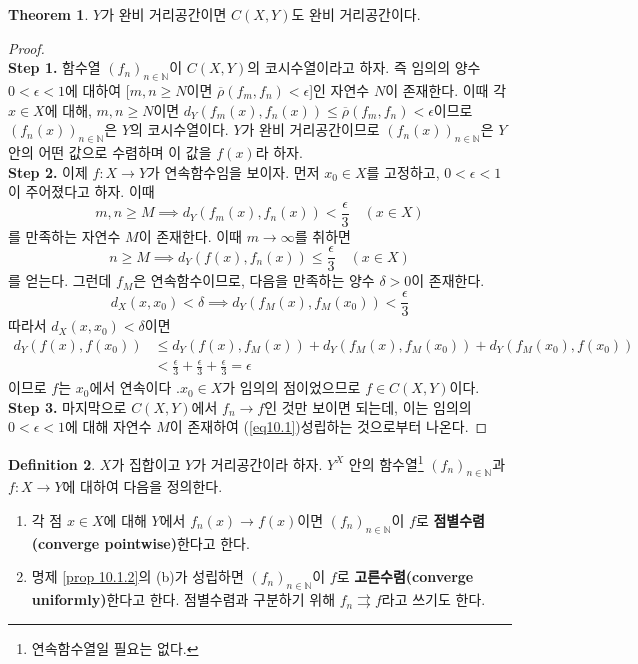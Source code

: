 \documentclass[11pt]{book}
\numberwithin{equation}{chapter}
\def\NN{\mathbb{N}}
\def\eps{\epsilon}
\theoremstyle{definition}
\newtheorem{thm}{Theorem}[section]
\newtheorem{defn}[thm]{Definition}
\newenvironment{enum}
	{\begin{enumerate}[label=(\alph*), leftmargin=2\parindent]}
	{\end{enumerate}}
\begin{document}
\begin{thm} \label{thm 10.1.3}
    \(Y\)가 완비 거리공간이면 \(C(X, Y)\)도 완비 거리공간이다.
\end{thm}
\begin{proof}
    \quad\\
    \textbf{Step 1.} 함수열 \((f_n)_{n \in \NN}\)이 \(C(X, Y)\)의 코시수열이라고 하자. 즉 임의의 양수 \(0 < \eps < 1\)에 대하여 [\(m,n \ge N\)이면 \(\overline{\rho}(f_m, f_n) < \eps\)]인 자연수 \(N\)이 존재한다. 이때 각 \(x \in X\)에 대해, \(m, n \ge N\)이면 \(d_Y(f_m(x), f_n(x)) \le \overline{\rho}(f_m, f_n) < \eps\)이므로 \((f_n(x))_{n \in \NN}\)은 \(Y\)의 코시수열이다. \(Y\)가 완비 거리공간이므로 \((f_n(x))_{n \in \NN}\)은 \(Y\) 안의 어떤 값으로 수렴하며 이 값을 \(f(x)\)라 하자.\\
    \textbf{Step 2.} 이제 \(f : X \to Y\)가 연속함수임을 보이자. 먼저 \(x_0 \in X\)를 고정하고, \(0 < \eps < 1\)이 주어졌다고 하자. 이때
    \[
      m, n \ge M \implies d_Y(f_m(x), f_n(x)) < \frac{\eps}{3}   \quad (x \in X)
    \]
    를 만족하는 자연수 \(M\)이 존재한다. 이때 \(m \to \infty\)를 취하면
    \begin{equation} \label{eq10.1}
        n \ge M \implies d_Y(f(x), f_n(x)) \le \frac{\eps}{3} \quad (x \in X)  
    \end{equation}
    를 얻는다. 그런데 \(f_M\)은 연속함수이므로, 다음을 만족하는 양수 \(\delta > 0\)이 존재한다.
    \[
    d_X(x, x_0) < \delta \implies d_Y(f_M(x), f_M(x_0)) < \frac{\eps}{3}
    \]
    따라서 \(d_X(x, x_0) < \delta\)이면
    \begin{align*}
        d_Y(f(x), f(x_0)) &\le d_Y(f(x), f_M(x)) + d_Y(f_M(x), f_M(x_0)) + d_Y(f_M(x_0), f(x_0))\\
        &< \frac{\eps}{3} + \frac{\eps}{3} + \frac{\eps}{3} = \eps
    \end{align*}
    이므로 \(f\)는 \(x_0\)에서 연속이다 .\(x_0 \in X\)가 임의의 점이었으므로 \(f \in C(X, Y)\)이다.\\
    \textbf{Step 3.} 마지막으로 \(C(X, Y)\)에서 \(f_n \to f\)인 것만 보이면 되는데, 이는 임의의 \(0 < \eps < 1\)에 대해 자연수 \(M\)이 존재하여 (\ref{eq10.1})\이 성립하는 것으로부터 나온다.
\end{proof}

\begin{defn}
    \(X\)가 집합이고 \(Y\)가 거리공간이라 하자. \(Y^X\) 안의 함수열\footnote{연속함수열일 필요는 없다.} \((f_n)_{n \in \NN}\)과 \(f : X \to Y\)에 대하여 다음을 정의한다.
    \begin{enum}
        \item 각 점 \(x \in X\)에 대해 \(Y\)에서 \(f_n(x) \to f(x)\)이면 \((f_n)_{n \in \NN}\)이 \(f\)로 \textbf{점별수렴(converge pointwise)}한다고 한다.
        \item 명제 \ref{prop 10.1.2}의 (b)가 성립하면 \((f_n)_{n \in \NN}\)이 \(f\)로 \textbf{고른수렴(converge uniformly)}한다고 한다. 점별수렴과 구분하기 위해 \(f_n \rightrightarrows f\)라고 쓰기도 한다.
    \end{enum}
\end{defn}
\end{document}
